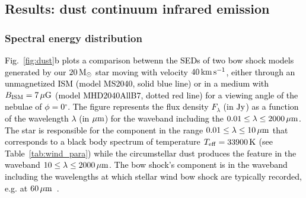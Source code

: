 \documentclass[useAMS,usenatbib]{mn2e}
\newcommand{\degree}{\ensuremath{^\circ}}
\begin{document}


\subsection{Results: dust continuum infrared emission}
\label{sect:infrared}





\subsubsection{Spectral energy distribution}
\label{sect:infrared_seds}


\textcolor{black}{
Fig.~\ref{fig:dust}b plots a comparison betwenn the SEDs of two bow shock models 
generated by our $20\, \rm M_{\odot}$ star moving with velocity $40\, \rm km\, 
\rm s^{-1}$,  either through an unmagnetized ISM (model 
MS2040, solid blue line) or in a medium with $B_{\rm ISM}=7\, \mu\rm G$ (model MHD2040AllB7, 
dotted red line) for a viewing angle of the nebulae of $\phi=0\degree$. The 
figure represents the flux density $F_{\lambda}$ (in $\rm Jy$) as a function of 
the wavelength $\lambda$ (in $\mu \rm m$) for the waveband including the 
$0.01\le \lambda \le 2000 \, \mu \rm m$. The star is 
responsible for the component in the range $0.01\le \lambda \le 10 \, \mu \rm m$ 
that corresponds to a black body spectrum of temperature $T_{\rm eff}=33900\, 
\rm K$ (see Table~\ref{tab:wind_para}) while the circumstellar dust produces 
the feature in the waveband $10\le \lambda \le 2000 \, \mu \rm m$.  
The bow shock's component is in the waveband including the wavelengths at which 
stellar wind bow shock are typically recorded, e.g. at $60\, \mu \rm m$~\citet{buren_apj_329_1988,
vanburen_aj_110_1995,noriegacrespo_aj_113_1997}. 
}
\end{document}
